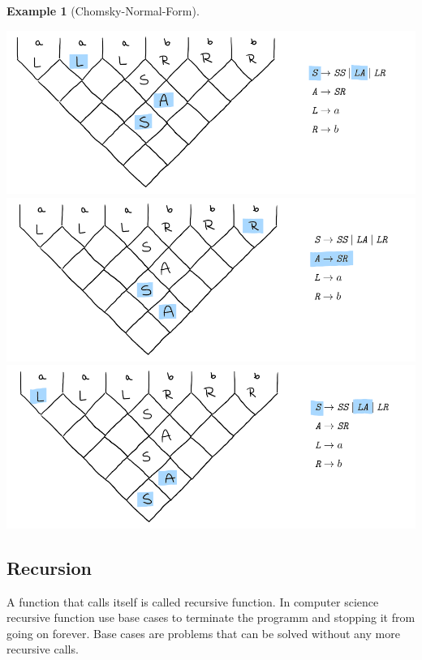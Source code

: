 \documentclass[a4paper, 11pt]{article}
\newtheorem*{example*}{Example}
\begin{document}
\begin{example*}[Chomsky-Normal-Form]
\begin{center}
\includegraphics[scale=0.9]{images/3.png} \\
\includegraphics[scale=0.9]{images/2.png} \\
\includegraphics[scale=0.9]{images/1.png} \\
\end{center}

\end{example*}




\subsection{Recursion}
\label{recursion}

A function that calls itself is called recursive function. In computer science recursive function use base cases to terminate the programm and stopping it from going on forever. Base cases are problems that can be solved without any more recursive calls.
\cite{recursion}
\end{document}
